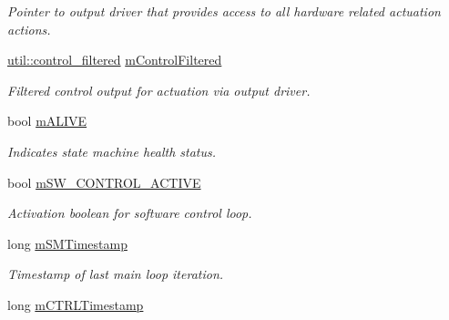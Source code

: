 \begin{DoxyCompactItemize}
\begin{DoxyCompactList}\small\item\em Pointer to output driver that provides access to all hardware related actuation actions. \end{DoxyCompactList}\item 
\hyperlink{structSPMB_1_1util_1_1control__filtered}{util\+::control\+\_\+filtered} \hyperlink{classSPMB_1_1StateMachine_ac073bedbf77604e5df582b14e2a610cb}{m\+Control\+Filtered}\hypertarget{classSPMB_1_1StateMachine_ac073bedbf77604e5df582b14e2a610cb}{}\label{classSPMB_1_1StateMachine_ac073bedbf77604e5df582b14e2a610cb}

\begin{DoxyCompactList}\small\item\em Filtered control output for actuation via output driver. \end{DoxyCompactList}\item 
bool \hyperlink{classSPMB_1_1StateMachine_a856ca0d82b6c3da4d60c1a52d6982faf}{m\+A\+L\+I\+VE}\hypertarget{classSPMB_1_1StateMachine_a856ca0d82b6c3da4d60c1a52d6982faf}{}\label{classSPMB_1_1StateMachine_a856ca0d82b6c3da4d60c1a52d6982faf}

\begin{DoxyCompactList}\small\item\em Indicates state machine health status. \end{DoxyCompactList}\item 
bool \hyperlink{classSPMB_1_1StateMachine_ac0318161d8396b4190dfc57f2d7ca3e5}{m\+S\+W\+\_\+\+C\+O\+N\+T\+R\+O\+L\+\_\+\+A\+C\+T\+I\+VE}\hypertarget{classSPMB_1_1StateMachine_ac0318161d8396b4190dfc57f2d7ca3e5}{}\label{classSPMB_1_1StateMachine_ac0318161d8396b4190dfc57f2d7ca3e5}

\begin{DoxyCompactList}\small\item\em Activation boolean for software control loop. \end{DoxyCompactList}\item 
long \hyperlink{classSPMB_1_1StateMachine_a372848ebc671d9a34982345bc90a255d}{m\+S\+M\+Timestamp}\hypertarget{classSPMB_1_1StateMachine_a372848ebc671d9a34982345bc90a255d}{}\label{classSPMB_1_1StateMachine_a372848ebc671d9a34982345bc90a255d}

\begin{DoxyCompactList}\small\item\em Timestamp of last main loop iteration. \end{DoxyCompactList}\item 
long \hyperlink{classSPMB_1_1StateMachine_ab8b439f683f473ae15201e3928a279b1}{m\+C\+T\+R\+L\+Timestamp}\hypertarget{classSPMB_1_1StateMachine_ab8b439f683f473ae15201e3928a279b1}{}\label{classSPMB_1_1StateMachine_ab8b439f683f473ae15201e3928a279b1}


\end{DoxyCompactItemize}
